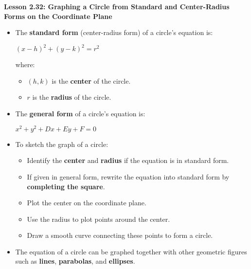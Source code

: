 \begin{center}
\textbf{Lesson 2.32: Graphing a Circle from Standard and Center-Radius Forms on the Coordinate Plane}
\end{center}

\vspace*{-1.5ex}

\begin{itemize}
    \item The \textbf{standard form} (center-radius form) of a circle’s equation is:

{\centering $
    (x - h)^2 + (y - k)^2 = r^2
$\par}
    where:
    \begin{itemize}
        \item $(h, k)$ is the \textbf{center} of the circle.
        \item $r$ is the \textbf{radius} of the circle.
    \end{itemize}
    \item The \textbf{general form} of a circle’s equation is:

{\centering $
    x^2 + y^2 + Dx + Ey + F = 0
$\par}
    \item To sketch the graph of a circle:
    \begin{itemize}
        \item Identify the \textbf{center} and \textbf{radius} if the equation is in standard form.
        \item If given in general form, rewrite the equation into standard form by \textbf{completing the square}.
        \item Plot the center on the coordinate plane.
        \item Use the radius to plot points around the center.
        \item Draw a smooth curve connecting these points to form a circle.
    \end{itemize}
    \item The equation of a circle can be graphed together with other geometric figures such as \textbf{lines}, \textbf{parabolas}, and \textbf{ellipses}.
\end{itemize}

